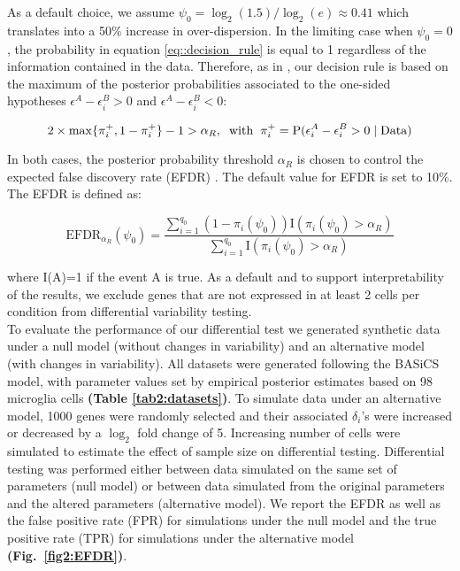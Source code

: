 As a default choice, we assume $\psi_0 = \log_2(1.5) / \log_2(e) \approx 0.41$ which translates into a 50\% increase in over-dispersion. In the limiting case when $\psi_0 = 0$, the probability in equation \eqref{eq::decision_rule} is equal to 1 regardless of the information contained in the data. Therefore, as in \cite{Bochkina2007}, our decision rule is based on the maximum of the posterior probabilities associated to the one-sided hypotheses $\epsilon^A - \epsilon^B_i > 0$ and  $\epsilon^A - \epsilon^B_i < 0$:

\begin{equation} \label{eq::decision_rule2} 2 \times \max\{\pi_i^+, 1-\pi_i^+\} - 1  >\alpha_R, \hspace{0.2cm} \text{with} \hspace{0.2cm} \pi_i^+ = \text{P}(\epsilon_i^{A}-\epsilon_i^{B} > 0 \mid \text{Data})
\end{equation}

In both cases, the posterior probability threshold $\alpha_R$ is chosen to control the expected false discovery rate (EFDR) \citep{Newton2004}. The default value for EFDR is set to 10\%. The EFDR is defined as:

\begin{equation}
\text{EFDR}_{\alpha_R}(\psi_0)=\frac{\sum_{i=1}^{q_0}(1-\pi_i(\psi_0))\text{I}(\pi_i(\psi_0)>\alpha_R)}{\sum_{i=1}^{q_0}\text{I}(\pi_i(\psi_0)>\alpha_R)}
\end{equation}

where I(A)=1 if the event A is true. As a default and to support interpretability of the results, we exclude genes that are not expressed in at least 2 cells per condition from differential variability testing.\\

To evaluate the performance of our differential test we generated synthetic data under a null model (without changes in variability) and an alternative model (with changes in variability). All datasets were generated following the BASiCS model, with parameter values set by empirical posterior estimates based on 98 microglia cells \citep{Zeisel2015} \textbf{(Table \ref{tab2:datasets})}. To simulate data under an alternative model, 1000 genes were randomly selected and their associated $\delta_i$'s were increased or decreased by a $\log_2$ fold change of 5. Increasing number of cells were simulated to estimate the effect of sample size on differential testing. Differential testing was performed either between data simulated on the same set of parameters (null model) or between data simulated from the original parameters and the altered parameters (alternative model). We report the EFDR \citep{Newton2004} as well as the false positive rate (FPR) for simulations under the null model and the true positive rate (TPR) for simulations under the alternative model \textbf{(Fig.~\ref{fig2:EFDR})}. 

